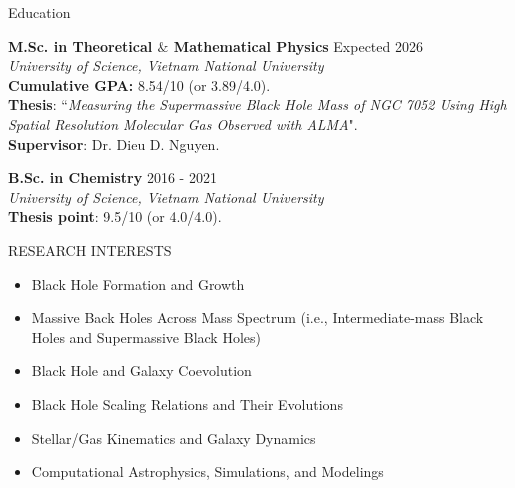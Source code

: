 \documentclass{resume} %
\begin{document}





\begin{rSection}{Education}

{\bf M.Sc. in Theoretical $\&$ Mathematical Physics} \hfill {Expected 2026}\\
\textit{University of Science, Vietnam National University}\\
{
\textbf{Cumulative GPA:} 8.54/10 (or 3.89/4.0). \\
\textbf{Thesis}: ``\textit{Measuring the Supermassive Black Hole Mass of NGC 7052 Using High Spatial Resolution Molecular Gas Observed with ALMA}".\\
\textbf{Supervisor}: Dr. Dieu D. Nguyen.
}

{\bf B.Sc. in Chemistry}  \hfill {2016 - 2021}\\
\textit{University of Science, Vietnam National University}\\
{\textbf{Thesis point}: 9.5/10 (or 4.0/4.0).}
\end{rSection}


\begin{rSection}{RESEARCH INTERESTS}
    \begin{itemize}
        \itemsep -5pt {} 
        \item Black Hole Formation and Growth
        \item Massive Back Holes Across Mass Spectrum (i.e., Intermediate-mass Black Holes and Supermassive Black Holes)
        \item Black Hole and Galaxy Coevolution
        \item Black Hole Scaling Relations and Their Evolutions
        \item Stellar/Gas Kinematics and Galaxy Dynamics
        \item Computational Astrophysics, Simulations, and Modelings
    \end{itemize}
\end{rSection}
\end{document}
